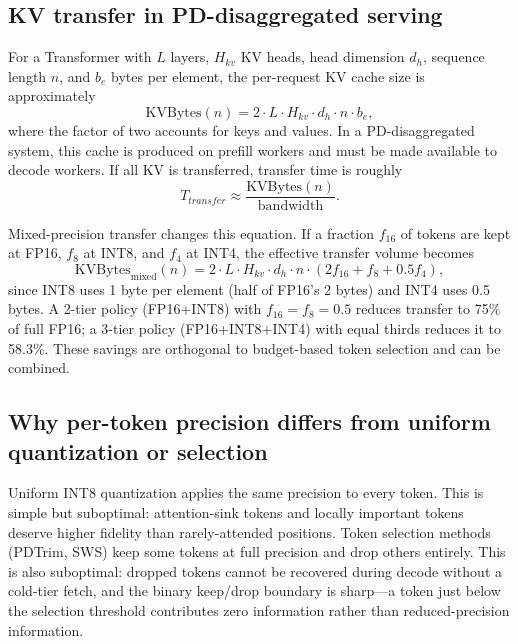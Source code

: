 \documentclass[11pt]{article}
\newcommand{\pct}{\%}
\theoremstyle{definition}
\theoremstyle{plain}
\begin{document}
\subsection{KV transfer in PD-disaggregated serving}
For a Transformer with $L$ layers, $H_{kv}$ KV heads, head dimension $d_h$, sequence length $n$, and $b_e$ bytes per element, the per-request KV cache size is approximately
\begin{equation}
  \mathrm{KVBytes}(n) = 2 \cdot L \cdot H_{kv} \cdot d_h \cdot n \cdot b_e,
\end{equation}
where the factor of two accounts for keys and values.  In a PD-disaggregated system, this cache is produced on prefill workers and must be made available to decode workers.  If all KV is transferred, transfer time is roughly
\begin{equation}
  T_{transfer} \approx \frac{\mathrm{KVBytes}(n)}{\mathrm{bandwidth}}.
\end{equation}

Mixed-precision transfer changes this equation.  If a fraction $f_{16}$ of tokens are kept at FP16, $f_8$ at INT8, and $f_4$ at INT4, the effective transfer volume becomes
\begin{equation}
  \mathrm{KVBytes}_{\mathrm{mixed}}(n) = 2 \cdot L \cdot H_{kv} \cdot d_h \cdot n \cdot (2 f_{16} + f_8 + 0.5 f_4),
\end{equation}
since INT8 uses 1 byte per element (half of FP16's 2 bytes) and INT4 uses 0.5 bytes.  A 2-tier policy (FP16+INT8) with $f_{16}=f_8=0.5$ reduces transfer to 75\pct{} of full FP16; a 3-tier policy (FP16+INT8+INT4) with equal thirds reduces it to 58.3\pct{}.  These savings are orthogonal to budget-based token selection and can be combined.

\subsection{Why per-token precision differs from uniform quantization or selection}
Uniform INT8 quantization applies the same precision to every token.  This is simple but suboptimal: attention-sink tokens and locally important tokens deserve higher fidelity than rarely-attended positions.  Token selection methods (PDTrim, SWS) keep some tokens at full precision and drop others entirely.  This is also suboptimal: dropped tokens cannot be recovered during decode without a cold-tier fetch, and the binary keep/drop boundary is sharp---a token just below the selection threshold contributes zero information rather than reduced-precision information.
\end{document}
